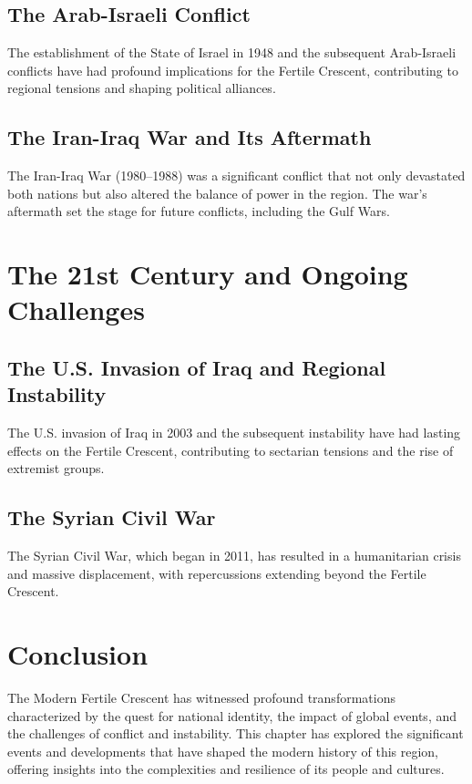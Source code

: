 \documentclass[a4paper,12pt]{book}
\begin{document}
\subsection{The Arab-Israeli Conflict}
The establishment of the State of Israel in 1948 and the subsequent Arab-Israeli conflicts have had profound implications for the Fertile Crescent, contributing to regional tensions and shaping political alliances.

\subsection{The Iran-Iraq War and Its Aftermath}
The Iran-Iraq War (1980–1988) was a significant conflict that not only devastated both nations but also altered the balance of power in the region. The war's aftermath set the stage for future conflicts, including the Gulf Wars.

\section{The 21st Century and Ongoing Challenges}
\label{sec:21st-century-challenges}

\subsection{The U.S. Invasion of Iraq and Regional Instability}
The U.S. invasion of Iraq in 2003 and the subsequent instability have had lasting effects on the Fertile Crescent, contributing to sectarian tensions and the rise of extremist groups.

\subsection{The Syrian Civil War}
The Syrian Civil War, which began in 2011, has resulted in a humanitarian crisis and massive displacement, with repercussions extending beyond the Fertile Crescent.

\section{Conclusion}
\label{sec:conclusion-modern-fertile-crescent}

The Modern Fertile Crescent has witnessed profound transformations characterized by the quest for national identity, the impact of global events, and the challenges of conflict and instability. This chapter has explored the significant events and developments that have shaped the modern history of this region, offering insights into the complexities and resilience of its people and cultures.
\end{document}
